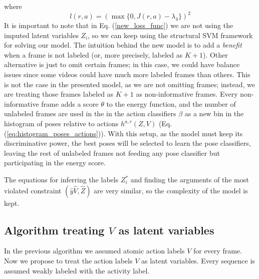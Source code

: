 \documentclass[10pt,letterpaper]{article}
\newcommand{\+}[1]{\ensuremath{{\boldsymbol #1}}}
\begin{document}
%
where
%
\begin{equation}
l(r,a) =  \left(  \max\{0, J(r,a) - \lambda_4 \}\right)^2
\end{equation}
%
It is important to note that in Eq. (\ref{new_loss_func}) we are not using the imputed latent variables $Z_i$, so we can keep using the structural SVM framework for solving our model. The intuition behind the new model is to add a \emph{benefit} when a frame is not labeled (or,  more precisely, labeled as $K+1$). Other alternative is just to omit certain frames; in this case, we could have balance issues since some videos could have much more labeled frames than others. This is not the case in the  presented model, as we are not omitting frames;  instead, we are treating those frames labeled as $K+1$ as non-informative frames. Every non-informative frame adds a score $\theta$ to the energy function, and  the number of unlabeled frames are used in the in the action classifiers $\beta$ as a new bin in the histogram of poses relative to actions $h^{a,r}(Z,V)$ (Eq. (\ref{eq:histogram_poses_actions})). With this setup, as the model must keep its discriminative power, the best poses will be selected to learn the pose classifiers, leaving the rest of unlabeled frames not feeding any pose classifier but participating in the energy score.

The equations for inferring the labels $Z_i^*$ and finding the arguments of  the most violated constraint $ (\hat y \hat V, \hat Z)$ are very similar, so the complexity of the model is kept.

   

\subsection{Algorithm treating $V$ as latent variables}

In the previous algorithm we assumed atomic action labels $V$ for every frame. Now we propose to treat the action labels $V$ as latent variables. Every sequence is assumed weakly labeled with the activity label. 
\end{document}
